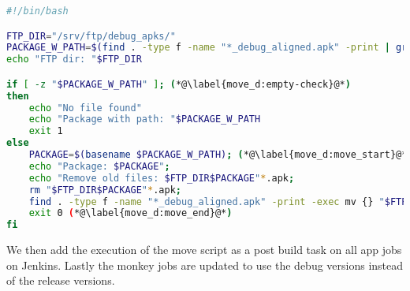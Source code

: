 \begin{lstlisting}[language=bash,showstringspaces=false,caption=Script that moves the debug APK to the ftp server,label=lst:move_debug_apk]
#!/bin/bash

FTP_DIR="/srv/ftp/debug_apks/"
PACKAGE_W_PATH=$(find . -type f -name "*_debug_aligned.apk" -print | grep ".+(?=_v[0-9]+\.[0-9]+b[0-9]+_debug_aligned\.apk)" -Po) (*@\label{move_d:package}@*)
echo "FTP dir: "$FTP_DIR

if [ -z "$PACKAGE_W_PATH" ]; (*@\label{move_d:empty-check}@*)
then
    echo "No file found"
    echo "Package with path: "$PACKAGE_W_PATH
    exit 1
else
    PACKAGE=$(basename $PACKAGE_W_PATH); (*@\label{move_d:move_start}@*)
    echo "Package: $PACKAGE";
    echo "Remove old files: $FTP_DIR$PACKAGE"*.apk;
    rm "$FTP_DIR$PACKAGE"*.apk;
    find . -type f -name "*_debug_aligned.apk" -print -exec mv {} "$FTP_DIR" \;
    exit 0 (*@\label{move_d:move_end}@*)
fi
\end{lstlisting}

We then add the execution of the move script as a post build task on all app jobs on Jenkins. Lastly the monkey jobs are updated to use the debug versions instead of the release versions.